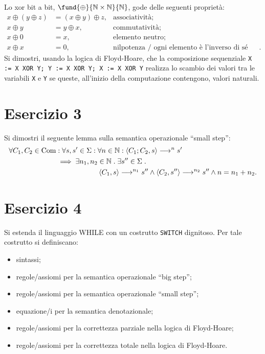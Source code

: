 Lo xor bit a bit, $\fund{\oplus}{\Nset \times \Nset}{\Nset}$,
gode delle seguenti propriet\`a:
\begin{align*}
x \oplus (y \oplus z ) &= (x \oplus y) \oplus z,
  &\text{associativit\`a}; \\
x \oplus y &= y \oplus x,
  &\text{commutativit\`a}; \\
x \oplus 0 &= x,
  &\text{elemento neutro}; \\
x \oplus x &= 0,
  &\text{nilpotenza / ogni elemento \`e l'inverso di s\'e stesso}.
\end{align*}
Si dimostri, usando la logica di Floyd-Hoare, che la composizione
sequenziale
\verb+X := X XOR Y; Y := X XOR Y; X := X XOR Y+
realizza lo scambio dei valori tra le variabili \verb+X+ e \verb+Y+
se queste, all'inizio della computazione contengono, valori naturali.

\section*{Esercizio 3}

Si dimostri il seguente lemma sulla semantica operazionale ``small step'':
\begin{align*}
  \forall C_1, C_2 \in \mathrm{Com} &\mathrel{:} \forall s, s' \in \Sigma
                             \mathrel{:} \forall n \in \mathbb{N} \mathrel{:}
    \langle C_1; C_2, s \rangle \longrightarrow^n s' \\
      &\implies \exists n_1, n_2 \in \mathbb{N} \mathrel{.} \exists s'' \in \Sigma \mathrel{.} \\
      &\qquad\qquad\qquad
        \langle C_1, s \rangle \longrightarrow^{n_1} s'' \land
        \langle C_2, s'' \rangle \longrightarrow^{n_2} s'' \land
        n = n_1 + n_2.
\end{align*}

\section*{Esercizio 4}
Si estenda il linguaggio WHILE con un costrutto
\verb+SWITCH+ dignitoso.
Per tale costrutto si definiscano:
\begin{itemize}
\item
sintassi;
\item
regole/assiomi per la semantica operazionale ``big step'';
\item
regole/assiomi per la semantica operazionale ``small step'';
\item
equazione/i per la semantica denotazionale;
\item
regole/assiomi per la correttezza parziale nella logica di Floyd-Hoare;
\item
regole/assiomi per la correttezza totale nella logica di Floyd-Hoare.
\end{itemize}
